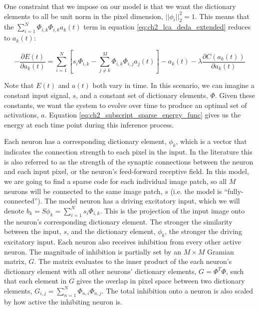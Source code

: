 One constraint that we impose on our model is that we want the dictionary elements to all be unit norm in the pixel dimension, $||\phi_{i}||_2^2 = 1$. This means that the $\sum_{i=1}^{N}\Phi_{i,k}\Phi_{i,k}a_{k}(t)$ term in equation \eqref{eq:ch2_lca_deda_extended} reduces to $a_k(t)$:

\begin{equation}\label{eq:ch2_lca_deda}
    -\frac{\partial E(t)}{\partial a_{k}(t)} =
    \sum\limits_{i=1}^{N} \left[ s_{i} \Phi_{i,k} -
    \sum\limits_{j \neq k}^{M} \Phi_{i,k} \Phi_{i,j} a_{j}(t) \right] - a_{k}(t) -
    \lambda \frac{\partial C(a_{k}(t))}{\partial a_{k}(t)}
\end{equation}

Note that $E(t)$ and $a(t)$ both vary in time. In this scenario, we can imagine a constant input signal, $s$, and a constant set of dictionary elements, $\Phi$. Given these constants, we want the system to evolve over time to produce an optimal set of activations, $a$. Equation \eqref{eq:ch2_subscript_sparse_energy_func} gives us the energy at each time point during this inference process.

Each neuron has a corresponding dictionary element, $\phi_{k}$, which is a vector that indicates the connection strength to each pixel in the input. In the literature this is also referred to as the strength of the synaptic connections between the neuron and each input pixel, or the neuron's feed-forward receptive field. In this model, we are going to find a sparse code for each individual image patch, so all $M$ neurons will be connected to the same image patch, $s$ (i.e. the model is ``fully-connected''). The model neuron has a driving excitatory input, which we will denote $b_{k} = S\phi_{k} = \sum_{i=1}^{N}s_{i} \Phi_{i,k}$. This is the projection of the input image onto the neuron's corresponding dictionary element. The stronger the similarity between the input, $s$, and the dictionary element, $\phi_{k}$, the stronger the driving excitatory input. Each neuron also receives inhibition from every other active neuron. The magnitude of inhibition is partially set by an $M \times M$ Gramian matrix, $G$. The matrix evaluates to the inner product of the each neuron's dictionary element with all other neurons' dictionary elements, $G = \Phi^T\Phi$, such that each element in $G$ gives the overlap in pixel space between two dictionary elements, $G_{i,j} = \sum\limits_{n=1}^{N} \Phi_{n,i}\Phi_{n,j}$. The total inhibition onto a neuron is also scaled by how active the inhibiting neuron is.

